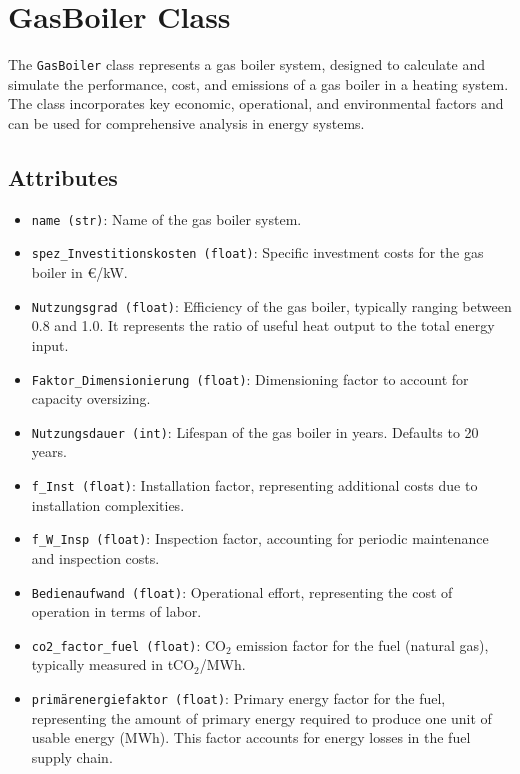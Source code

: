 \section{GasBoiler Class}
The \texttt{GasBoiler} class represents a gas boiler system, designed to calculate and simulate the performance, cost, and emissions of a gas boiler in a heating system. The class incorporates key economic, operational, and environmental factors and can be used for comprehensive analysis in energy systems.

\subsection{Attributes}
\begin{itemize}
    \item \texttt{name (str)}: Name of the gas boiler system.
    \item \texttt{spez\_Investitionskosten (float)}: Specific investment costs for the gas boiler in €/kW. 
    \item \texttt{Nutzungsgrad (float)}: Efficiency of the gas boiler, typically ranging between 0.8 and 1.0. It represents the ratio of useful heat output to the total energy input.
    \item \texttt{Faktor\_Dimensionierung (float)}: Dimensioning factor to account for capacity oversizing.
    \item \texttt{Nutzungsdauer (int)}: Lifespan of the gas boiler in years. Defaults to 20 years.
    \item \texttt{f\_Inst (float)}: Installation factor, representing additional costs due to installation complexities.
    \item \texttt{f\_W\_Insp (float)}: Inspection factor, accounting for periodic maintenance and inspection costs.
    \item \texttt{Bedienaufwand (float)}: Operational effort, representing the cost of operation in terms of labor.
    \item \texttt{co2\_factor\_fuel (float)}: CO$_2$ emission factor for the fuel (natural gas), typically measured in tCO$_2$/MWh.
    \item \texttt{primärenergiefaktor (float)}: Primary energy factor for the fuel, representing the amount of primary energy required to produce one unit of usable energy (MWh). This factor accounts for energy losses in the fuel supply chain.
\end{itemize}

